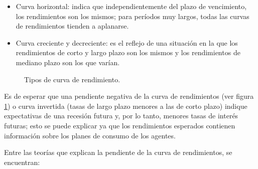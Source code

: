 \begin{itemize}
   \item Curva horizontal: indica que independientemente del plazo de vencimiento, los rendimientos son los mismos; para per\'iodos muy largos, todas las      curvas de rendimientos tienden a aplanarse.
\end{itemize}

\newpage

\begin{itemize}
  \item Curva creciente y decreciente: es el reflejo de una situaci\'on en la    que los rendimientos de corto y largo plazo son los mismos y los rendimientos  de mediano plazo son los que var\'ian.
\end{itemize}

\begin{figure}[h]
\caption{Tipos de curva de rendimiento.}
\label{tipos_c}
\end{figure}

\hspace*{0.4 cm} Es de esperar que una pendiente negativa de la curva de rendimientos (ver figura \ref{tipos_c}) o curva invertida (tasas de largo plazo menores a las de corto plazo) indique expectativas de una recesi\'on futura y, por lo tanto, menores tasas de inter\'es futuras; esto se puede explicar ya que los rendimientos esperados contienen informaci\'on sobre los planes de consumo de los agentes. 

\hspace*{0.4 cm} Entre las teor\'ias que explican la pendiente de la curva de rendimientos, se encuentran:

